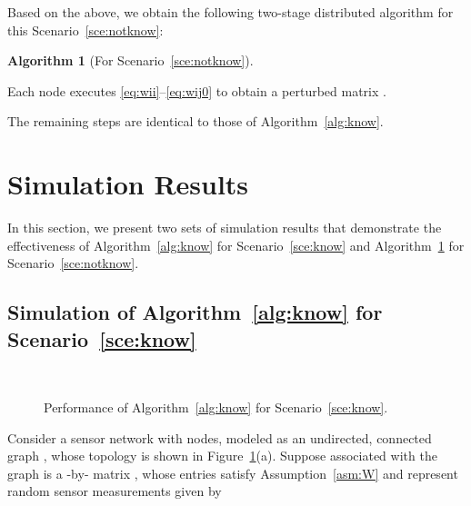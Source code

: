 \documentclass[11pt]{article}
\theoremstyle{plain}
\theoremstyle{definition}
\newtheorem{algorithm}{Algorithm}
\theoremstyle{remark}
\newenvironment{algorithmstep}{\ \begin{list}{\labelenumi}{\topsep0in\itemsep0in\parsep0in\labelwidth1in\usecounter{enumi}}}{\hfill\end{list}}
\begin{document}
Based on the above, we obtain the following two-stage distributed algorithm for this Scenario~\ref{sce:notknow}:

\begin{algorithm}[For Scenario~\ref{sce:notknow}]\label{alg:notknow}
\begin{algorithmstep}
\item Each node  executes \eqref{eq:wii}--\eqref{eq:wij0} to obtain a perturbed matrix .
\item The remaining steps are identical to those of Algorithm~\ref{alg:know}.
\end{algorithmstep}
\end{algorithm}

\section{Simulation Results}\label{sec:simuresu}

In this section, we present two sets of simulation results that demonstrate the effectiveness of Algorithm~\ref{alg:know} for Scenario~\ref{sce:know} and Algorithm~\ref{alg:notknow} for Scenario~\ref{sce:notknow}.

\subsection{Simulation of Algorithm~\ref{alg:know} for Scenario~\ref{sce:know}}\label{ssec:simualgoscenknow}

\begin{figure}[tb]
\centering{}\quad{}\\ \quad{}
\caption{Performance of Algorithm~\ref{alg:know} for Scenario~\ref{sce:know}.}
\label{fig:sce1}
\end{figure}

Consider a sensor network with  nodes, modeled as an undirected, connected graph , whose topology is shown in Figure~\ref{fig:sce1}(a). Suppose associated with the graph  is a -by- matrix , whose entries satisfy Assumption~\ref{asm:W} and represent random sensor measurements given by
\end{document}
